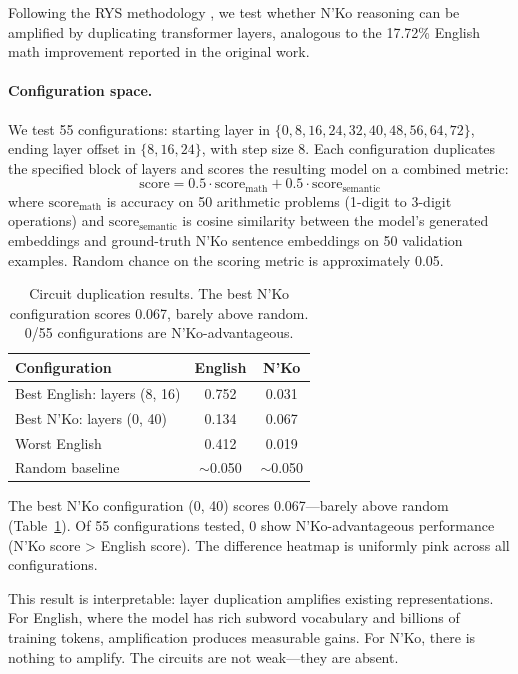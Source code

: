 \documentclass[11pt]{article}
\begin{document}
Following the RYS methodology \cite{ng2024rys}, we test whether N'Ko reasoning can be amplified by duplicating transformer layers, analogous to the 17.72\% English math improvement reported in the original work.

\paragraph{Configuration space.}
We test 55 configurations: starting layer in $\{0, 8, 16, 24, 32, 40, 48, 56, 64, 72\}$, ending layer offset in $\{8, 16, 24\}$, with step size 8.
Each configuration duplicates the specified block of layers and scores the resulting model on a combined metric:
\begin{equation}
\text{score} = 0.5 \cdot \text{score}_\text{math} + 0.5 \cdot \text{score}_\text{semantic}
\end{equation}
where $\text{score}_\text{math}$ is accuracy on 50 arithmetic problems (1-digit to 3-digit operations) and $\text{score}_\text{semantic}$ is cosine similarity between the model's generated embeddings and ground-truth N'Ko sentence embeddings on 50 validation examples.
Random chance on the scoring metric is approximately 0.05.

\begin{table}[t]
\centering
\small
\begin{tabular}{lcc}
\toprule
\textbf{Configuration} & \textbf{English} & \textbf{N'Ko} \\
\midrule
Best English: layers (8, 16) & 0.752 & 0.031 \\
Best N'Ko: layers (0, 40) & 0.134 & 0.067 \\
Worst English & 0.412 & 0.019 \\
Random baseline & ${\sim}$0.050 & ${\sim}$0.050 \\
\bottomrule
\end{tabular}
\caption{Circuit duplication results. The best N'Ko configuration scores 0.067, barely above random. 0/55 configurations are N'Ko-advantageous.}
\label{tab:circuit-dup}
\end{table}

The best N'Ko configuration (0, 40) scores 0.067---barely above random (Table~\ref{tab:circuit-dup}).
Of 55 configurations tested, 0 show N'Ko-advantageous performance (N'Ko score > English score).
The difference heatmap is uniformly pink across all configurations.

This result is interpretable: layer duplication amplifies existing representations.
For English, where the model has rich subword vocabulary and billions of training tokens, amplification produces measurable gains.
For N'Ko, there is nothing to amplify.
The circuits are not weak---they are absent.
\end{document}
